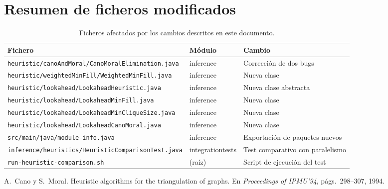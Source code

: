 \documentclass[11pt, a4paper]{article}
\begin{document}
\section{Resumen de ficheros modificados}
\label{sec:ficheros}

\begin{table}[h]
\centering
\caption{Ficheros afectados por los cambios descritos en este documento.}
\label{tab:ficheros}
\renewcommand{\arraystretch}{1.2}
\begin{tabular}{p{7.5cm} p{2.2cm} p{5cm}}
\toprule
\textbf{Fichero} & \textbf{Módulo} & \textbf{Cambio} \\
\midrule
\texttt{heuristic/canoAndMoral/CanoMoralElimination.java}
  & inference & Corrección de dos bugs \\
\texttt{heuristic/weightedMinFill/WeightedMinFill.java}
  & inference & Nueva clase \\
\texttt{heuristic/lookahead/LookaheadHeuristic.java}
  & inference & Nueva clase abstracta \\
\texttt{heuristic/lookahead/LookaheadMinFill.java}
  & inference & Nueva clase \\
\texttt{heuristic/lookahead/LookaheadMinCliqueSize.java}
  & inference & Nueva clase \\
\texttt{heuristic/lookahead/LookaheadCanoMoral.java}
  & inference & Nueva clase \\
\texttt{src/main/java/module-info.java}
  & inference & Exportación de paquetes nuevos \\
\texttt{inference/heuristics/HeuristicComparisonTest.java}
  & integrationtests & Test comparativo con paralelismo \\
\texttt{run-heuristic-comparison.sh}
  & (raíz) & Script de ejecución del test \\
\bottomrule
\end{tabular}
\end{table}

\begin{thebibliography}{9}
A.~Cano y S.~Moral.
\newblock Heuristic algorithms for the triangulation of graphs.
\newblock En \emph{Proceedings of IPMU'94}, págs.~298--307, 1994.
\end{thebibliography}
\end{document}
